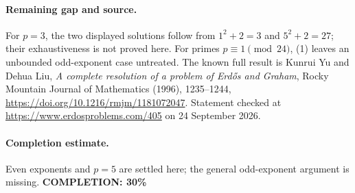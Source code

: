 \paragraph{Remaining gap and source.}
For \(p=3\), the two displayed solutions follow from
\(1^2+2=3\) and \(5^2+2=27\); their exhaustiveness is not proved here.
For primes \(p\equiv1\pmod{24}\), (1) leaves an unbounded odd-exponent
case untreated. The known full result is Kunrui Yu and Dehua Liu,
\emph{A complete resolution of a problem of Erd\H{o}s and Graham},
Rocky Mountain Journal of Mathematics (1996), 1235--1244,
\url{https://doi.org/10.1216/rmjm/1181072047}.
Statement checked at \url{https://www.erdosproblems.com/405}
on 24 September 2026.

\paragraph{Completion estimate.}
Even exponents and \(p=5\) are settled here; the general odd-exponent argument is missing.
\textbf{COMPLETION: 30\%}
